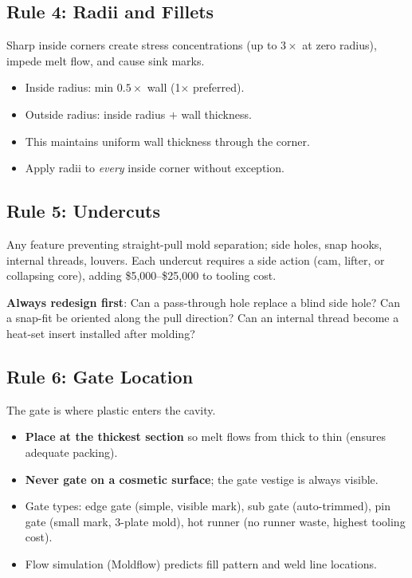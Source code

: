 \subsection{Rule 4: Radii and Fillets}

Sharp inside corners create stress concentrations (up to $3\times$ at zero radius), impede melt flow, and cause sink marks.

\begin{itemize}[nosep,leftmargin=1.5em]
  \item Inside radius: min $0.5\times$ wall (1$\times$ preferred).
  \item Outside radius: inside radius $+$ wall thickness.
  \item This maintains uniform wall thickness through the corner.
  \item Apply radii to \emph{every} inside corner without exception.
\end{itemize}

\subsection{Rule 5: Undercuts}

Any feature preventing straight-pull mold separation; side holes, snap hooks, internal threads, louvers. Each undercut requires a side action (cam, lifter, or collapsing core), adding \$5,000--\$25,000 to tooling cost.

\textbf{Always redesign first}: Can a pass-through hole replace a blind side hole? Can a snap-fit be oriented along the pull direction? Can an internal thread become a heat-set insert installed after molding?

\subsection{Rule 6: Gate Location}

The gate is where plastic enters the cavity.

\begin{itemize}[nosep,leftmargin=1.5em]
  \item \textbf{Place at the thickest section} so melt flows from thick to thin (ensures adequate packing).
  \item \textbf{Never gate on a cosmetic surface}; the gate vestige is always visible.
  \item Gate types: edge gate (simple, visible mark), sub gate (auto-trimmed), pin gate (small mark, 3-plate mold), hot runner (no runner waste, highest tooling cost).
  \item Flow simulation (Moldflow) predicts fill pattern and weld line locations.
\end{itemize}



